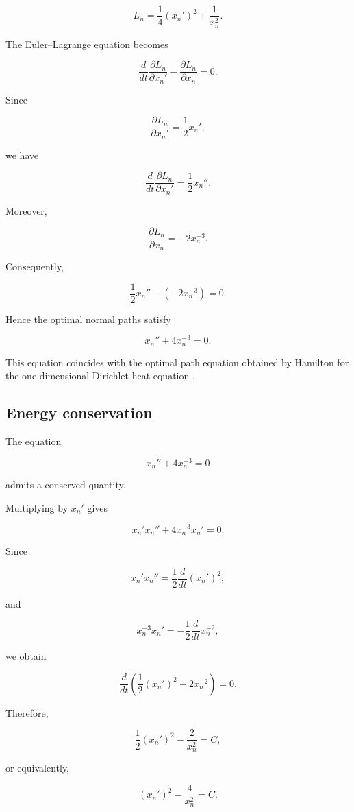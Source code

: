 \documentclass[11pt]{amsart}
\theoremstyle{definition}
\theoremstyle{remark}
\begin{document}
\[
L_n
=
\frac14(x_n')^2
+
\frac1{x_n^2}.
\]


The Euler--Lagrange equation becomes

\[
\frac d{dt}
\frac{\partial L_n}{\partial x_n'}
-
\frac{\partial L_n}{\partial x_n}
=0 .
\]


Since

\[
\frac{\partial L_n}{\partial x_n'}
=
\frac12x_n',
\]

we have

\[
\frac d{dt}
\frac{\partial L_n}{\partial x_n'}
=
\frac12x_n'' .
\]


Moreover,

\[
\frac{\partial L_n}{\partial x_n}
=
-2x_n^{-3}.
\]


Consequently,

\[
\frac12x_n''
-
(-2x_n^{-3})
=
0 .
\]


Hence the optimal normal paths satisfy

\[
\boxed{
x_n''
+
4x_n^{-3}
=
0 .
}
\]


This equation coincides with the optimal path equation obtained by
Hamilton for the one-dimensional Dirichlet heat equation
\cite{Hamilton2011}.



\subsection{Energy conservation}


The equation

\[
x_n''
+
4x_n^{-3}
=
0
\]

admits a conserved quantity.

Multiplying by $x_n'$ gives

\[
x_n'x_n''
+
4x_n^{-3}x_n'
=
0 .
\]


Since

\[
x_n'x_n''
=
\frac12
\frac d{dt}(x_n')^2,
\]

and

\[
x_n^{-3}x_n'
=
-\frac12
\frac d{dt}x_n^{-2},
\]

we obtain

\[
\frac d{dt}
\left(
\frac12(x_n')^2
-
2x_n^{-2}
\right)
=0 .
\]


Therefore,

\[
\boxed{
\frac12(x_n')^2
-
\frac2{x_n^2}
=
C ,
}
\]

or equivalently,

\[
\boxed{
(x_n')^2
-
\frac4{x_n^2}
=
C .
}
\]
\end{document}
